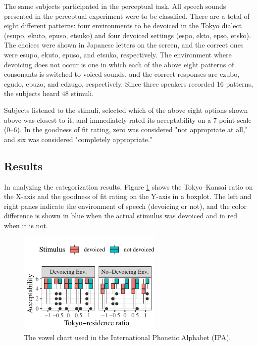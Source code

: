 \documentclass[a4paper,11pt,twocolumn]{article}
\begin{document}
The same subjects participated in the perceptual task. All speech sounds presented in the perceptual experiment were to be classified. There are a total of eight different patterns: four environments to be devoiced in the Tokyo dialect (esupo, ekuto, epuso, etsuko) and four devoiced settings (espo, ekto, epso, etsko). The choices were shown in Japanese letters on the screen, and the correct ones were esupo, ekuto, epuso, and etsuko, respectively. The environment where devoicing does not occur is one in which each of the above eight patterns of consonants is switched to voiced sounds, and the correct responses are ezubo, egudo, ebuzo, and edzugo, respectively. Since three speakers recorded 16 patterns, the subjects heard 48 stimuli.

Subjects listened to the stimuli, selected which of the above eight options shown above was closest to it, and immediately rated its acceptability on a 7-point scale (0--6). In the goodness of fit rating, zero was considered "not appropriate at all," and six was considered "completely appropriate."

\subsection{Results}

In analyzing the categorization results, Figure \ref{fig:cat_results} shows the Tokyo--Kansai ratio on the X-axis and the goodness of fit rating on the Y-axis in a boxplot. The left and right panes indicate the environment of speech (devoicing or not), and the color difference is shown in blue when the actual stimulus was devoiced and in red when it is not.

\begin{figure}[!ht]
\begin{center}
\includegraphics[width=7cm]{../results/artifact/results_categorization.pdf}
\caption{The vowel chart used in the International Phonetic
Alphabet (IPA).}\label{fig:cat_results}
\end{center}
\end{figure}
\end{document}
